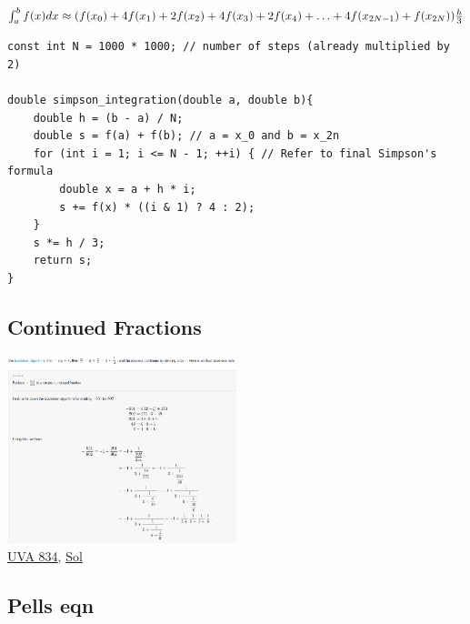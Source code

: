 \documentclass[8pt, a4paper, oneside, twocolumn]{extarticle}
\begin{document}
$\int_a ^ b f (x) dx \approx (f (x_0) + 4 f (x_1) + 2 f (x_2) + 4f(x_3) + 2 f(x_4)\\ + \ldots + 4 f(x_{2N-1}) + f(x_{2N}) )\frac {h} {3}$
\begin{verbatim}
const int N = 1000 * 1000; // number of steps (already multiplied by 2)

double simpson_integration(double a, double b){
    double h = (b - a) / N;
    double s = f(a) + f(b); // a = x_0 and b = x_2n
    for (int i = 1; i <= N - 1; ++i) { // Refer to final Simpson's formula
        double x = a + h * i;
        s += f(x) * ((i & 1) ? 4 : 2);
    }
    s *= h / 3;
    return s;
}
\end{verbatim}
\subsection{Continued Fractions}
\includegraphics[width=0.5\textwidth,height=0.5\textheight,keepaspectratio]{assets/confr}
\\\href{https://uva.onlinejudge.org/external/8/834.pdf}{UVA 834}, \href{https://github.com/sourabhxyz/Competitive-Programming/blob/master/UVA_834.cpp}{Sol}
\subsection{Pells eqn}
\end{document}
